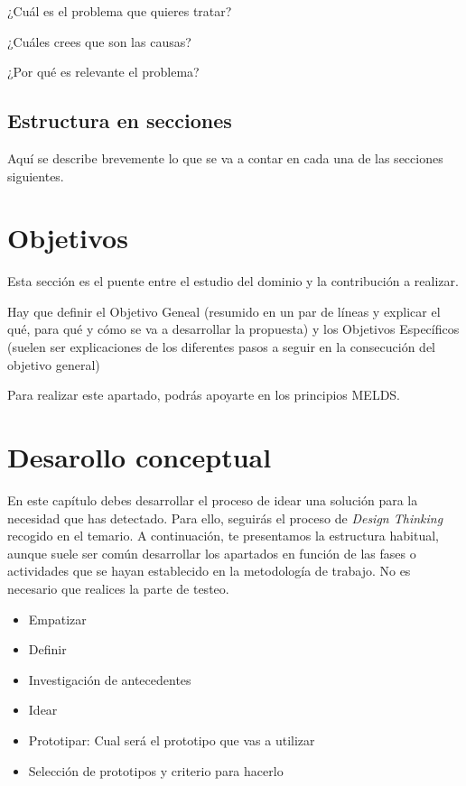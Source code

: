 \documentclass[12pt,a4paper]{proyectoinnovacion}
\begin{document}
¿Cuál es el problema que quieres tratar?

¿Cuáles crees que son las causas?

¿Por qué es relevante el problema?


\subsection{Estructura en secciones}

Aquí se describe brevemente lo que se va a contar en cada una de las secciones siguientes.

\section{Objetivos}

Esta sección es el puente entre el estudio del dominio y la contribución a realizar. 

Hay que definir el Objetivo Geneal (resumido en un par de líneas y explicar el qué, para qué y cómo se va a desarrollar la propuesta) y los Objetivos Específicos (suelen ser explicaciones de los diferentes pasos a seguir en la consecución del objetivo general)

Para realizar este apartado, podrás apoyarte en los principios MELDS.


\section{Desarollo conceptual}


En este capítulo debes desarrollar el proceso de idear una solución para la necesidad que has detectado. Para ello, seguirás el proceso de \textit{Design Thinking} recogido en el temario. A continuación, te presentamos la estructura habitual, aunque suele ser común desarrollar los apartados en función de las fases o actividades que se hayan establecido en la metodología de trabajo. No es necesario que realices la parte de testeo.

\begin{itemize}
  \item Empatizar
  \item Definir
  \item Investigación de antecedentes
  \item Idear
  \item Prototipar: Cual será el prototipo que vas a utilizar
  \item Selección de prototipos y criterio para hacerlo  
\end{itemize}
\end{document}
